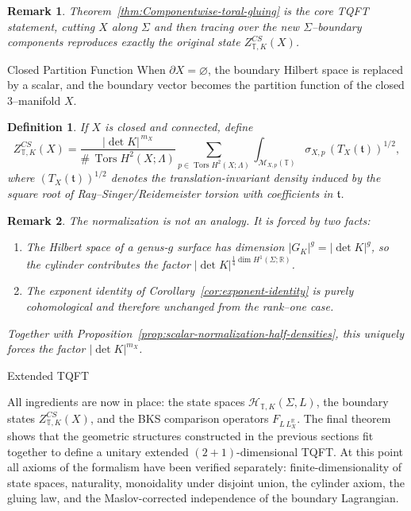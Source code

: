 \documentclass[12pt]{amsart}
\makeatletter
\renewcommand\subsection{\@startsection{subsection}{2}%
  \z@{.5\linespacing\@plus.7\linespacing}{-.5em}%
  {\normalfont\bfseries}}
\numberwithin{equation}{section}
\newtheorem{definition}[theorem]{Definition}
\newtheorem*{remark}{Remark}
\DeclareMathOperator{\Tors}{Tors}
\makeatother
\begin{document}
\begin{remark}
Theorem~\ref{thm:Componentwise-toral-gluing} is the core TQFT statement, cutting \(X\) along \(\Sigma\) and then tracing over the new \(\Sigma\)--boundary components reproduces exactly the original state \(Z^{CS}_{\mathbb T,K}(X)\).
\end{remark}

\subsection{Closed Partition Function}
When \(\partial X=\varnothing\), the boundary Hilbert space is replaced by a scalar, and the boundary vector becomes the partition function of the closed \(3\)--manifold \(X\).

\begin{definition}
\label{def:closed-toral-partition-function}
If $X$ is closed and connected, define
\[
Z^{CS}_{\mathbb T,K}(X)
=
\frac{|\det K|^{\,m_X}}{\#\,\Tors H^2(X;\Lambda)}
\sum_{p\in \Tors H^2(X;\Lambda)}
\int_{\mathcal M_{X,p}(\mathbb T)}
\sigma_{X,p}\,(T_X(\mathfrak t))^{1/2},
\]
where $(T_X(\mathfrak t))^{1/2}$ denotes the translation-invariant density
induced by the square root of Ray--Singer/Reidemeister torsion with coefficients
in $\mathfrak t$.
\end{definition}

\begin{remark}
The normalization is not an analogy.
It is forced by two facts:
\begin{enumerate}
\item[\textup{(i)}]
The Hilbert space of a genus-$g$ surface has dimension
$|G_K|^g=|\det K|^g$, so the cylinder contributes the factor
$|\det K|^{\frac14\dim H^1(\Sigma;\mathbb R)}$.
\item[\textup{(ii)}]
The exponent identity of Corollary~\ref{cor:exponent-identity} is purely
cohomological and therefore unchanged from the rank--one case.
\end{enumerate}
Together with Proposition~\ref{prop:scalar-normalization-half-densities},
this uniquely forces the factor $|\det K|^{m_X}$.
\end{remark}

\subsection{Extended TQFT}

All ingredients are now in place: the state spaces
\(\mathcal H_{\mathbb T,K}(\Sigma,L)\), the boundary states
\(Z^{CS}_{\mathbb T,K}(X)\), and the BKS comparison operators
\(F_{L\,L_X^{\mathbb R}}\). The final theorem shows that the geometric structures constructed in the previous sections fit together to define a unitary extended $(2+1)$-dimensional TQFT.
At this point all axioms of the  formalism have been verified separately: finite-dimensionality
of state spaces, naturality, monoidality under disjoint union, the cylinder axiom, the gluing law, and the
Maslov-corrected independence of the boundary Lagrangian.
\end{document}
